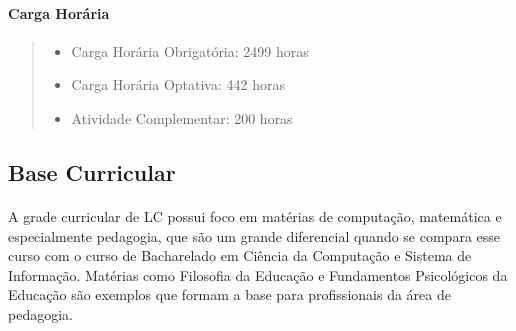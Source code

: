     \paragraph{Carga Horária}
    \begin{quote}
	    \begin{itemize}
    	    \item{Carga Horária Obrigatória: 2499 horas}
            \item{Carga Horária Optativa: 442 horas}
            \item{Atividade Complementar: 200 horas}
        \end{itemize}
    \end{quote}

\subsection{Base Curricular}
    \paragraph{}A grade curricular de LC possui foco em matérias de computação, matemática e especialmente pedagogia, que são um grande diferencial quando se compara esse curso com o curso de Bacharelado em Ciência da Computação e Sistema de Informação. Matérias como Filosofia da Educação e Fundamentos Psicológicos da Educação são exemplos que formam a base para profissionais da área de pedagogia. 


